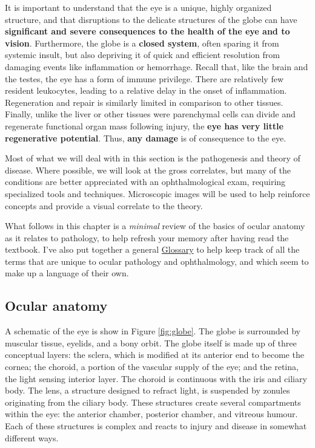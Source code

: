 \documentclass[
  openany]{article}
\begin{document}
It is important to understand that the eye is a unique, highly organized structure, and that disruptions to the delicate structures of the globe can have \textbf{significant and severe consequences to the health of the eye and to vision}. Furthermore, the globe is a \textbf{closed system}, often sparing it from systemic insult, but also depriving it of quick and efficient resolution from damaging events like inflammation or hemorrhage. Recall that, like the brain and the testes, the eye has a form of immune privilege. There are relatively few resident leukocytes, leading to a relative delay in the onset of inflammation. Regeneration and repair is similarly limited in comparison to other tissues. Finally, unlike the liver or other tissues were parenchymal cells can divide and regenerate functional organ mass following injury, the \textbf{eye has very little regenerative potential}. Thus, \textbf{any damage} is of consequence to the eye.

Most of what we will deal with in this section is the pathogenesis and theory of disease. Where possible, we will look at the gross correlates, but many of the conditions are better appreciated with an ophthalmological exam, requiring specialized tools and techniques. Microscopic images will be used to help reinforce concepts and provide a visual correlate to the theory.

What follows in this chapter is a \emph{minimal} review of the basics of ocular anatomy as it relates to pathology, to help refresh your memory after having read the textbook. I've also put together a general \protect\hyperlink{glossary}{Glossary} to help keep track of all the terms that are unique to ocular pathology and ophthalmology, and which seem to make up a language of their own.

\hypertarget{ocular-anatomy}{%
\subsection{Ocular anatomy}\label{ocular-anatomy}}

A schematic of the eye is show in Figure \ref{fig:globe}. The globe is surrounded by muscular tissue, eyelids, and a bony orbit. The globe itself is made up of three conceptual layers: the sclera, which is modified at its anterior end to become the cornea; the choroid, a portion of the vascular supply of the eye; and the retina, the light sensing interior layer. The choroid is continuous with the iris and ciliary body. The lens, a structure designed to refract light, is suspended by zonules originating from the ciliary body. These structures create several compartments within the eye: the anterior chamber, posterior chamber, and vitreous humour. Each of these structures is complex and reacts to injury and disease in somewhat different ways.
\end{document}
